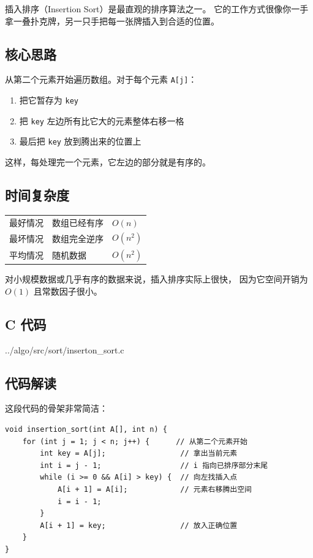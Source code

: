 插入排序（Insertion Sort）是最直观的排序算法之一。
它的工作方式很像你一手拿一叠扑克牌，另一只手把每一张牌插入到合适的位置。

\subsection{核心思路}

从第二个元素开始遍历数组。对于每个元素 \texttt{A[j]}：

\begin{enumerate}
    \item 把它暂存为 \texttt{key}
    \item 把 \texttt{key} 左边所有比它大的元素整体右移一格
    \item 最后把 \texttt{key} 放到腾出来的位置上
\end{enumerate}

这样，每处理完一个元素，它左边的部分就是有序的。

\subsection{时间复杂度}

\begin{center}
\begin{tabular}{lll}
最好情况 & 数组已经有序 & \(O(n)\) \\
最坏情况 & 数组完全逆序 & \(O(n^2)\) \\
平均情况 & 随机数据 & \(O(n^2)\) \\
\end{tabular}
\end{center}

对小规模数据或几乎有序的数据来说，插入排序实际上很快，
因为它空间开销为 \(O(1)\) 且常数因子很小。

\subsection{C 代码}


{../algo/src/sort/inserton_sort.c}

\subsection{代码解读}

这段代码的骨架非常简洁：

\begin{lstlisting}[style=cstyle]
void insertion_sort(int A[], int n) {
    for (int j = 1; j < n; j++) {      // 从第二个元素开始
        int key = A[j];                 // 拿出当前元素
        int i = j - 1;                  // i 指向已排序部分末尾
        while (i >= 0 && A[i] > key) {  // 向左找插入点
            A[i + 1] = A[i];            // 元素右移腾出空间
            i = i - 1;
        }
        A[i + 1] = key;                 // 放入正确位置
    }
}
\end{lstlisting}

